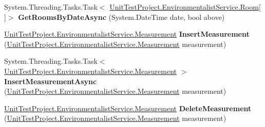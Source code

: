 \begin{DoxyCompactItemize}
\item 
\hypertarget{interface_unit_test_project_1_1_environmentalist_service_1_1_i_service1_a15d1aafc37d725723ea4d994ab46e9e3}{}System.\+Threading.\+Tasks.\+Task$<$ \hyperlink{class_unit_test_project_1_1_environmentalist_service_1_1_room}{Unit\+Test\+Project.\+Environmentalist\+Service.\+Room}\mbox{[}$\,$\mbox{]}$>$ {\bfseries Get\+Rooms\+By\+Date\+Async} (System.\+Date\+Time date, bool above)\label{interface_unit_test_project_1_1_environmentalist_service_1_1_i_service1_a15d1aafc37d725723ea4d994ab46e9e3}

\item 
\hypertarget{interface_unit_test_project_1_1_environmentalist_service_1_1_i_service1_ab97567df450d9b62a3d393acde51e6d8}{}\hyperlink{class_unit_test_project_1_1_environmentalist_service_1_1_measurement}{Unit\+Test\+Project.\+Environmentalist\+Service.\+Measurement} {\bfseries Insert\+Measurement} (\hyperlink{class_unit_test_project_1_1_environmentalist_service_1_1_measurement}{Unit\+Test\+Project.\+Environmentalist\+Service.\+Measurement} measurement)\label{interface_unit_test_project_1_1_environmentalist_service_1_1_i_service1_ab97567df450d9b62a3d393acde51e6d8}

\item 
\hypertarget{interface_unit_test_project_1_1_environmentalist_service_1_1_i_service1_a99afdd398bf8335b7a3d465785a203ed}{}System.\+Threading.\+Tasks.\+Task$<$ \hyperlink{class_unit_test_project_1_1_environmentalist_service_1_1_measurement}{Unit\+Test\+Project.\+Environmentalist\+Service.\+Measurement} $>$ {\bfseries Insert\+Measurement\+Async} (\hyperlink{class_unit_test_project_1_1_environmentalist_service_1_1_measurement}{Unit\+Test\+Project.\+Environmentalist\+Service.\+Measurement} measurement)\label{interface_unit_test_project_1_1_environmentalist_service_1_1_i_service1_a99afdd398bf8335b7a3d465785a203ed}

\item 
\hypertarget{interface_unit_test_project_1_1_environmentalist_service_1_1_i_service1_afa0a97ee2a77ee8f30b0ca589cf8e2f7}{}\hyperlink{class_unit_test_project_1_1_environmentalist_service_1_1_measurement}{Unit\+Test\+Project.\+Environmentalist\+Service.\+Measurement} {\bfseries Delete\+Measurement} (\hyperlink{class_unit_test_project_1_1_environmentalist_service_1_1_measurement}{Unit\+Test\+Project.\+Environmentalist\+Service.\+Measurement} measurement)\label{interface_unit_test_project_1_1_environmentalist_service_1_1_i_service1_afa0a97ee2a77ee8f30b0ca589cf8e2f7}


\end{DoxyCompactItemize}
